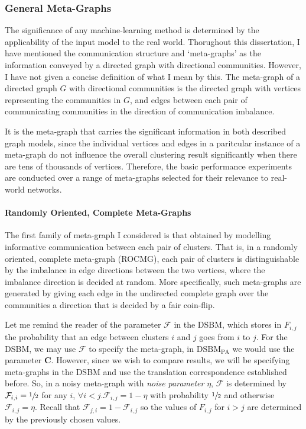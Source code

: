 \subsubsection{General Meta-Graphs}
The significance of any machine-learning method is determined by the applicability of the input 
model to the real world. Thorughout this dissertation, I have mentioned the communication 
structure and `meta-graphs' as the information conveyed by a directed graph with directional 
communities. However, I have not given a concise definition of what I mean by this. 
The meta-graph of a directed graph $G$ with directional communities is the directed graph with 
vertices representing the communities in $G$, and edges between each pair of communicating 
communities in the direction of communication imbalance.

It is the meta-graph that carries the significant information in both described graph models, since
the individual vertices and edges in a paritcular instance of a meta-graph do not influence the 
overall clustering result significantly when there are tens of thousands of vertices. Therefore,
the basic performance experiments are conducted over a range of meta-graphs selected for their 
relevance to real-world networks.

\paragraph{Randomly Oriented, Complete Meta-Graphs} The first family of meta-graph I considered is
that obtained by modelling informative communication between each pair of clusters. That is, in 
a randomly oriented, complete meta-graph (ROCMG), each pair of clusters is distinguishable by the imbalance 
in edge directions between the two vertices, where the imbalance direction is decided at random. 
More specifically, such meta-graphs are generated by giving each edge in the undirected complete 
graph over the communities a direction that is decided by a fair coin-flip. 

Let me remind the reader of the parameter $\mathcal{F}$ in the DSBM, which stores in $F_{i,j}$ the
probability that an edge between clusters $i$ and $j$ goes from $i$ to $j$. For the DSBM, we may
use $\mathcal F$ to specify the meta-graph, in $\mathrm{DSBM}_\mathrm{PA}$ we would use the 
parameter $\mathbf C$. However, since we wish to compare results, we will be specifying meta-graphs 
in the DSBM and use the translation correspondence established before. So, in a noisy meta-graph 
with \emph{noise parameter} $\eta$, $\mathcal F$ is determined by $\mathcal{F}_{i,i} = \sfrac12$
for any $i$, $\forall i < j. \mathcal F_{i,j} = 1-\eta$ with probability $\sfrac12$ and otherwise
$\mathcal{F}_{i,j} = \eta$. Recall that $\mathcal F_{j,i} = 1-\mathcal{F}_{i,j}$ so the values of 
$F_{i,j}$ for $i > j$ are determined by the previously chosen values. 

